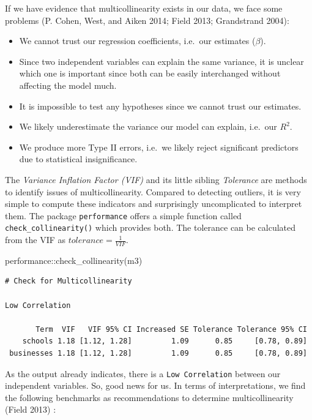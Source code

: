 \documentclass[
  letterpaper,
]{krantz}
\makeatletter
\newenvironment{Shaded}{\begin{snugshade}}{\end{snugshade}}
\newcommand{\FunctionTok}[1]{\textcolor[rgb]{0.28,0.35,0.67}{#1}}
\newcommand{\NormalTok}[1]{\textcolor[rgb]{0.00,0.23,0.31}{#1}}
\newcommand{\SpecialCharTok}[1]{\textcolor[rgb]{0.37,0.37,0.37}{#1}}
\newenvironment{kframe}{%
\medskip{}
\setlength{\fboxsep}{.8em}
 \def\at@end@of@kframe{}%
 \ifinner\ifhmode%
  \def\at@end@of@kframe{\end{minipage}}%
  \begin{minipage}{\columnwidth}%
 \fi\fi%
 \def\FrameCommand##1{\hskip\@totalleftmargin \hskip-\fboxsep
 \colorbox{shadecolor}{##1}\hskip-\fboxsep
     \hskip-\linewidth \hskip-\@totalleftmargin \hskip\columnwidth}%
 \MakeFramed {\advance\hsize-\width
   \@totalleftmargin\z@ \linewidth\hsize
   \@setminipage}}%
 {\par\unskip\endMakeFramed%
 \at@end@of@kframe}
\renewenvironment{Shaded}{\begin{kframe}}{\end{kframe}}
\makeatother
\begin{document}
If we have evidence that multicollinearity exists in our data, we face
some problems (P. Cohen, West, and Aiken 2014; Field 2013; Grandstrand
2004):

\begin{itemize}
\item
  We cannot trust our regression coefficients, i.e.~our estimates
  (\(\beta\)).
\item
  Since two independent variables can explain the same variance, it is
  unclear which one is important since both can be easily interchanged
  without affecting the model much.
\item
  It is impossible to test any hypotheses since we cannot trust our
  estimates.
\item
  We likely underestimate the variance our model can explain, i.e.~our
  \(R^2\).
\item
  We produce more Type II errors, i.e.~we likely reject significant
  predictors due to statistical insignificance.
\end{itemize}

The \emph{Variance Inflation Factor (VIF)} and its little sibling
\emph{Tolerance} are methods to identify issues of multicollinearity.
Compared to detecting outliers, it is very simple to compute these
indicators and surprisingly uncomplicated to interpret them. The package
\texttt{performance} offers a simple function called
\texttt{check\_collinearity()} which provides both. The tolerance can be
calculated from the VIF as \(tolerance = \frac{1}{VIF}\).

\begin{Shaded}
\begin{Highlighting}[]
\NormalTok{performance}\SpecialCharTok{::}\FunctionTok{check\_collinearity}\NormalTok{(m3)}
\end{Highlighting}
\end{Shaded}

\begin{verbatim}
# Check for Multicollinearity

Low Correlation

       Term  VIF   VIF 95% CI Increased SE Tolerance Tolerance 95% CI
    schools 1.18 [1.12, 1.28]         1.09      0.85     [0.78, 0.89]
 businesses 1.18 [1.12, 1.28]         1.09      0.85     [0.78, 0.89]
\end{verbatim}

As the output already indicates, there is a \texttt{Low\ Correlation}
between our independent variables. So, good news for us. In terms of
interpretations, we find the following benchmarks as recommendations to
determine multicollinearity (Field 2013) :
\end{document}

